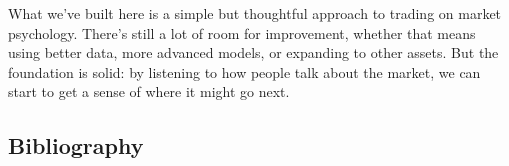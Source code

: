 \documentclass[
  a4paper]{article}
\begin{document}
What we've built here is a simple but thoughtful approach to trading on
market psychology. There's still a lot of room for improvement, whether
that means using better data, more advanced models, or expanding to
other assets. But the foundation is solid: by listening to how people
talk about the market, we can start to get a sense of where it might go
next.

\hypertarget{bibliography}{%
\subsection{Bibliography}\label{bibliography}}


\printbibliography
\end{document}

